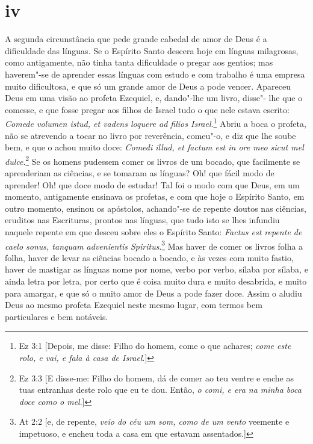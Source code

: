 \section*{iv}

A segunda circunstância que pede grande cabedal de amor de Deus é a
dificuldade das línguas. Se o Espírito Santo descera hoje em línguas
milagrosas, como antigamente, não tinha tanta dificuldade o pregar aos
gentios; mas haverem"-se de aprender essas línguas com estudo e com
trabalho é uma empresa muito dificultosa, e que só um grande amor de
Deus a pode vencer. Apareceu Deus em uma visão ao profeta Ezequiel, e,
dando"-lhe um livro, disse"- lhe que o comesse, e que fosse pregar aos
filhos de Israel tudo o que nele estava escrito: \emph{Comede volumen
istud, et vadens loquere ad filios Israel}.\footnote{Ez 3:1 [Depois, me disse: Filho do homem, come o que achares; \emph{come este rolo, e vai, e fala à casa
de Israel}.]} Abriu a boca o
profeta, não se atrevendo a tocar no livro por reverência, comeu"-o, e
diz que lhe soube bem, e que o achou muito doce: \emph{Comedi illud, et
factum est in ore meo sicut mel dulce}.\footnote{Ez 3:3 [E disse-me: Filho do homem, dá de comer ao teu ventre e enche as tuas entranhas deste rolo que eu te dou. Então, \emph{o comi, e era na minha boca doce como o mel}.]} Se os homens pudessem 
comer os livros de um bocado, que facilmente se aprenderiam as ciências,
e se tomaram as línguas? Oh! que fácil modo de aprender! Oh! que doce
modo de estudar! Tal foi o modo com que Deus, em um momento, antigamente
ensinava os profetas, e com que hoje o Espírito Santo, em outro momento,
ensinou os apóstolos, achando"-se de repente doutos nas ciências,
eruditos nas Escrituras, prontos nas línguas, que tudo isto se lhes
infundiu naquele repente em que
desceu sobre eles o Espírito Santo: \emph{Factus est repente de caelo
sonus, tanquam advenientis Spiritus}.\footnote{At 2:2 [e, de repente, \emph{veio do céu um som, como de um vento} veemente e impetuoso, e encheu toda a casa em que estavam assentados.]} Mas haver de comer os livros folha
a folha, haver de levar as ciências bocado a bocado, e às vezes com
muito fastio, haver de mastigar as línguas nome por nome, verbo por
verbo, sílaba por sílaba, e ainda letra por letra, por certo que é coisa
muito dura e muito desabrida, e muito para amargar, e que só o muito
amor de Deus a pode fazer doce. Assim o aludiu Deus ao mesmo profeta
Ezequiel neste mesmo lugar, com termos bem particulares e bem notáveis.

